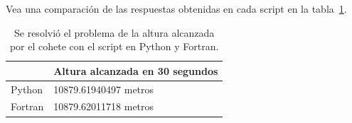 Vea una comparación de las respuestas obtenidas en cada script en la tabla~\ref{table_results}.

\begin{table}[hbt!]
    \begin{threeparttable}
    \caption{Se resolvió el problema de la altura alcanzada por el cohete con el script en Python y Fortran.}
    \label{table_results}
    \begin{tabular}{ll}
    \toprule
    \headrow  & Altura alcanzada en 30 segundos \\
    \midrule
    Python & 10879.61940497 metros \\ 
    \midrule
    Fortran & 10879.62011718 metros \\ 
    \bottomrule
    \end{tabular}
\end{threeparttable}
\end{table}